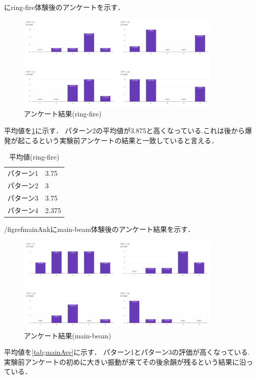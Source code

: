 \newpage

にring-fire体験後のアンケートを示す．

\begin{figure}[h]
  \centering
  \includegraphics[clip,width=10cm]{fig/ringfireAnk.png}
  \caption{アンケート結果(ring-fire)}\label{ringAnk}
  \end{figure}


平均値を\ref{tab;ringAve}に示す．
パターン2の平均値が3.875と高くなっている.これは後から爆発が起こるという実験前アンケートの結果と一致していると言える．

\begin{table}[H]
    \caption{平均値(ring-fire)}
    \centering
    \begin{tabular}{l|l}
    \hline
    \hline
    パターン1 & 3.75\\
    パターン2 & 3\\
    パターン3 & 3.75\\
    パターン4 & 2.375\\
    \hline
    \end{tabular}
    \label{tab;ringAve}
\end{table}

\newpage
/figref{mainAnk}にmain-beam体験後のアンケート結果を示す．

\begin{figure}[h]
  \centering
  \includegraphics[clip,width=10cm]{fig/mainbeamAnk.png}
  \caption{アンケート結果(main-beam)}\label{mainAnk}
  \end{figure}


平均値を\ref{tab;mainAve}に示す．
パターン1とパターン3の評価が高くなっている.実験前アンケートの初めに大きい振動が来てその後余韻が残るという結果に沿っている．

